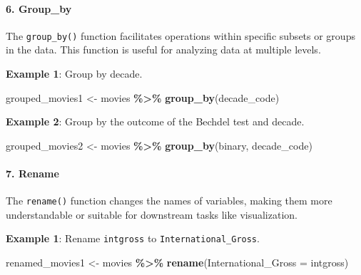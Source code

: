 \documentclass[
]{book}
\newenvironment{Shaded}{\begin{snugshade}}{\end{snugshade}}
\newcommand{\AttributeTok}[1]{\textcolor[rgb]{0.13,0.29,0.53}{#1}}
\newcommand{\FunctionTok}[1]{\textcolor[rgb]{0.13,0.29,0.53}{\textbf{#1}}}
\newcommand{\NormalTok}[1]{#1}
\newcommand{\OtherTok}[1]{\textcolor[rgb]{0.56,0.35,0.01}{#1}}
\newcommand{\SpecialCharTok}[1]{\textcolor[rgb]{0.81,0.36,0.00}{\textbf{#1}}}
\begin{document}
\hypertarget{group_by}{%
\paragraph*{6. Group\_by}\label{group_by}}

The \texttt{group\_by()} function facilitates operations within specific subsets or groups in the data. This function is useful for analyzing data at multiple levels.

\textbf{Example 1}: Group by decade.

\begin{Shaded}
\begin{Highlighting}[]
\NormalTok{grouped\_movies1 }\OtherTok{\textless{}{-}}\NormalTok{ movies }\SpecialCharTok{\%\textgreater{}\%}
  \FunctionTok{group\_by}\NormalTok{(decade\_code)}
\end{Highlighting}
\end{Shaded}

\textbf{Example 2}: Group by the outcome of the Bechdel test and decade.

\begin{Shaded}
\begin{Highlighting}[]
\NormalTok{grouped\_movies2 }\OtherTok{\textless{}{-}}\NormalTok{ movies }\SpecialCharTok{\%\textgreater{}\%}
  \FunctionTok{group\_by}\NormalTok{(binary, decade\_code)}
\end{Highlighting}
\end{Shaded}

\hypertarget{rename}{%
\paragraph*{7. Rename}\label{rename}}

The \texttt{rename()} function changes the names of variables, making them more understandable or suitable for downstream tasks like visualization.

\textbf{Example 1}: Rename \texttt{intgross} to \texttt{International\_Gross}.

\begin{Shaded}
\begin{Highlighting}[]
\NormalTok{renamed\_movies1 }\OtherTok{\textless{}{-}}\NormalTok{ movies }\SpecialCharTok{\%\textgreater{}\%}
  \FunctionTok{rename}\NormalTok{(}\AttributeTok{International\_Gross =}\NormalTok{ intgross)}
\end{Highlighting}
\end{Shaded}
\end{document}
